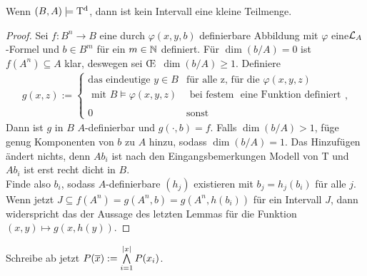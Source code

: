 \begin{theorem}
	Wenn $(B,A)\models\operatorname{T^d}$, dann ist kein Intervall eine kleine Teilmenge.
\end{theorem}
\begin{proof}
	Sei $f:B^n\rightarrow B$ eine durch $\varphi(x,y,b)$ definierbare Abbildung mit $\varphi$ eine\linebreak$\mathcal{L}_A$-Formel und $b\in B^m$ für ein $m\in\mathbb{N}$ definiert. Für $\dim(b/A)=0$ ist $f(A^n)\subseteq A$ klar, deswegen sei \OE\ $\dim(b/A)\geq1$. Definiere
	\begin{align*}
	g(x,z):=\left\{\begin{array}{ll}
	\text{das eindeutige }y\in B &\text{für alle z, für die }\varphi(x,y,z)\\
	\text{ mit }B\models\varphi(x,y,z) &\text{ bei festem }\text{ eine Funktion definiert}\\
	\ &\ \\
	0 &\text{sonst}
	\end{array}\right.,
	\end{align*}
	Dann ist $g$ in $B$ $A$-definierbar und $g(\cdot,b)=f$. Falls $\dim(b/A)>1$, füge genug Komponenten von $b$ zu $A$ hinzu, sodass $\dim(b/A)=1$. Das Hinzufügen ändert nichts, denn $Ab_i$ ist nach den Eingangsbemerkungen Modell von T und $Ab_i$ ist erst recht dicht in $B$.\\
	Finde also $b_i$, sodass $A$-definierbare $(h_j)$ existieren mit $b_j=h_j(b_i)$ für alle $j$. Wenn jetzt $J\subseteq f(A^n)=g(A^n,b)=g(A^n,h(b_i))$ für ein Intervall $J$, dann widerspricht das der Aussage des letzten Lemmas für die Funktion $(x,y)\mapsto g(x,h(y))$.
\end{proof}

\begin{definition}
	Schreibe ab jetzt $P(\overline{x}):=\bigwedge\limits_{i=1}^{\left| x \right|}P(x_i)$.
\end{definition}

